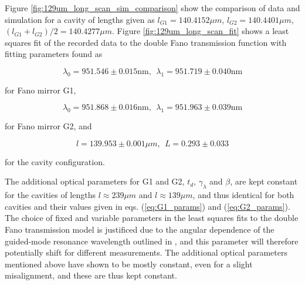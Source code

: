 Figure \ref{fig:129um_long_scan_sim_comparison} show the comparison of data and simulation for a cavity of lengths given as $l_{G1} = 140.4152 \mu m$, $l_{G2} = 140.4401 \mu m$, $(l_{G1} + l_{G2})/2 = 140.4277 \mu m$. Figure \ref{fig:129um_long_scan_fit} shows a least squares fit of the recorded data to the double Fano transmission function with fitting parameters found as 

\begin{equation}
    \lambda_0 = 951.546 \pm 0.015 \text{nm}, \:\: \lambda_1 = 951.719 \pm 0.040 \text{nm}
\end{equation}

for Fano mirror G1,

\begin{equation}
    \lambda_0 = 951.868 \pm 0.016 \text{nm}, \:\: \lambda_1 = 951.963 \pm 0.039 \text{nm}
\end{equation}

for Fano mirror G2, and

\begin{equation}
    l = 139.953 \pm 0.001 \mu m, \:\: L = 0.293 \pm 0.033
\end{equation}

for the cavity configuration.

The additional optical parameters for G1 and G2, $t_d$, $\gamma_{\lambda}$ and $\beta$, are kept constant for the cavities of lengths $l\approx 239 \mu m$ and $l \approx 139 \mu m$, and thus identical for both cavities and their values given in eqs. (\ref{eq:G1_params}) and (\ref{eq:G2_params}). The choice of fixed and variable parameters in the least squares fits to the double Fano transmission model is justificed due to the angular dependence of the guided-mode resonance wavelength outlined in \cite{Parthenopoulos}, and this parameter will therefore potentially shift for different measurements. The additional optical parameters mentioned above have shown to be mostly constant, even for a slight misalignment, and these are thus kept constant. 

